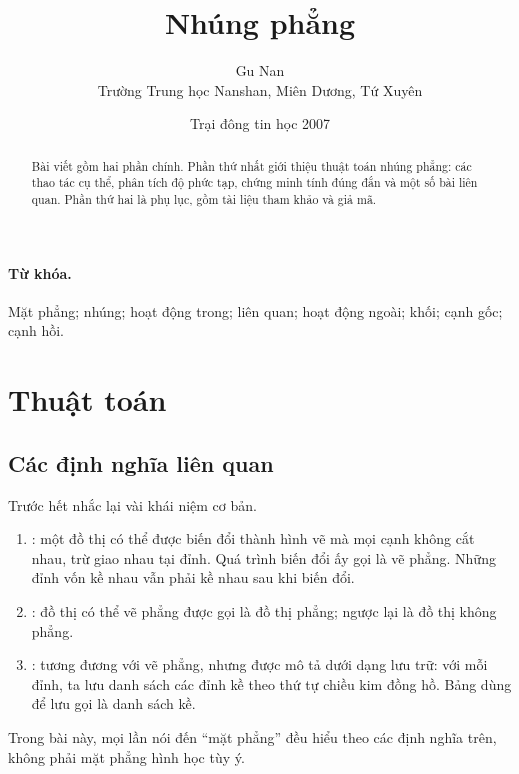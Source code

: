 \documentclass[11pt]{article}
\title{Nhúng phẳng}
\author{Gu Nan\\Trường Trung học Nanshan, Miên Dương, Tứ Xuyên}
\date{Trại đông tin học 2007}
\begin{document}
\maketitle


\begin{abstract}
Bài viết gồm hai phần chính. Phần thứ nhất giới thiệu thuật toán nhúng phẳng:
các thao tác cụ thể, phân tích độ phức tạp, chứng minh tính đúng đắn và một số
bài liên quan. Phần thứ hai là phụ lục, gồm tài liệu tham khảo và giả mã.
\end{abstract}

\paragraph{Từ khóa.}
Mặt phẳng; nhúng; hoạt động trong; liên quan; hoạt động ngoài; khối; cạnh gốc;
cạnh hồi.

\section{Thuật toán}

\subsection{Các định nghĩa liên quan}

Trước hết nhắc lại vài khái niệm cơ bản.

\begin{enumerate}
  \item {}: một đồ thị có thể được biến đổi thành hình vẽ mà mọi
  cạnh không cắt nhau, trừ giao nhau tại đỉnh. Quá trình biến đổi ấy gọi là vẽ
  phẳng. Những đỉnh vốn kề nhau vẫn phải kề nhau sau khi biến đổi.

  \item {}: đồ thị có thể vẽ phẳng được gọi là đồ thị phẳng;
  ngược lại là đồ thị không phẳng.

  \item {}: tương đương với vẽ phẳng, nhưng được mô tả dưới
  dạng lưu trữ: với mỗi đỉnh, ta lưu danh sách các đỉnh kề theo thứ tự chiều
  kim đồng hồ. Bảng dùng để lưu gọi là danh sách kề.
\end{enumerate}

Trong bài này, mọi lần nói đến ``mặt phẳng'' đều hiểu theo các định nghĩa trên,
không phải mặt phẳng hình học tùy ý.
\end{document}
